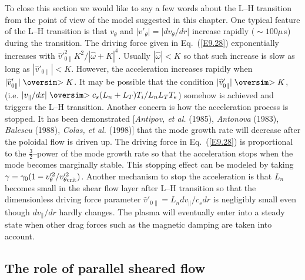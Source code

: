 \documentclass[a4paper,openany,12pt]{book}
\def\nms{\mathsurround=0pt}
\def\gtsim{\mathrel{\mathpalette\oversim>}} %
\def\oversim#1#2{\lower 2pt\vbox{\baselineskip 0pt \lineskip 1pt
    \ialign{$\nms#1\hfil##\hfil$\crcr#2\crcr\sim\crcr}}}
\begin{document}
{To close this section we would like to say a few words about the L--H transition from the point of view of the model suggested in this chapter. One typical feature of the L--H transition is that $v_\theta$ and $|v'_\theta|=|dv_\theta/dr|$ increase rapidly $(\sim 100\mu\,$s) during the transition. The driving force given in Eq.~(\ref{E9.28}) exponentially increases with $\widehat v'^2_{0\|}K^2/|\widehat\omega+K|^4$. Usually $|\widehat\omega|<K$ so that such increase is slow as long as $|\widehat v'_{0\|}|<K$. However, the acceleration increases rapidly when 
$|\widehat v'_{0\|}|\gtsim K$. It may be possible that the condition 
$|\widehat v'_{0\|}|\gtsim K$, (i.e. $|v_\|/dx|\gtsim c_s(L_n+L_T)T_i/L_n L_T 
T_e$) somehow is achieved and triggers the L--H transition. Another concern is how the acceleration process is stopped. It has been demonstrated [\emph{Antipov, et al.} (1985), \emph{Antonova} (1983), \emph{Balescu} (1988), \emph{Colas, et al.} (1998)] that the mode growth rate will decrease after the poloidal flow is driven up. The driving force in Eq.~(\ref{E9.28}) is proportional to the $\frac{3}{2}$--power of the mode growth rate so that the acceleration stops when the mode becomes marginally stable. This stopping effect can be modeled by taking $\gamma=\gamma_0(1-v'^2_\theta/v'^2_{\theta\rm crit})$. Another mechanism to stop the acceleration is that $L_n$ becomes small in the shear flow layer after L--H transition so that the dimensionless driving force parameter $\widehat v'_{0\|}=L_ndv_\|/c_sdr$ is negligibly small even though $dv_\|/dr$ hardly changes. The plasma will eventually enter into a steady state when other drag forces such as the magnetic damping are taken into account.

\subsection{The role of parallel sheared flow}

}
\end{document}
